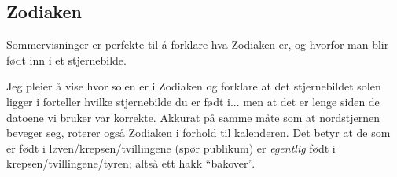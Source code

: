 \documentclass[../SommerstjernerA4.tex]{subfiles}
\begin{document}
\subsection{Zodiaken}
Sommervisninger er perfekte til å forklare hva Zodiaken er, og hvorfor man blir født inn i et stjernebilde. 

Jeg pleier å vise hvor solen er i Zodiaken og forklare at det stjernebildet solen ligger i forteller hvilke stjernebilde du er født i... men at det er lenge siden de datoene vi bruker var korrekte. Akkurat på samme måte som at nordstjernen beveger seg, roterer også Zodiaken i forhold til kalenderen. Det betyr at de som er født i løven/krepsen/tvillingene (spør publikum) er \emph{egentlig} født i krepsen/tvillingene/tyren; altså ett hakk ``bakover''.
\end{document}
